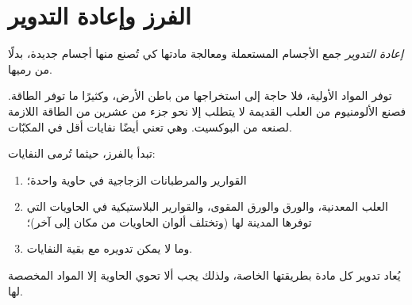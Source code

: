\section{الفرز وإعادة التدوير}

\begin{definition}\label{def:g5:raw-materials-and-recycling:recycling}
\emph{إعادة التدوير} جمع الأجسام المستعملة ومعالجة
مادتها كي تُصنع منها أجسام جديدة، بدلًا من رميها.
\end{definition}

\begin{proposition}\label{prop:g5:raw-materials-and-recycling:why}
 توفر المواد الأولية، فلا حاجة إلى استخراجها من باطن الأرض،
وكثيرًا ما توفر الطاقة. فصنع الألومنيوم من العلب القديمة لا يتطلب إلا
نحو جزء من عشرين من الطاقة اللازمة لصنعه من البوكسيت. وهي تعني أيضًا
نفايات أقل في المكبّات.
\end{proposition}

\begin{method}\label{met:g5:raw-materials-and-recycling:sort}
تبدأ  بالفرز، حيثما تُرمى النفايات:
\begin{enumerate}
  \item القوارير والمرطبانات الزجاجية في حاوية واحدة؛
  \item العلب المعدنية، والورق والورق المقوى، والقوارير البلاستيكية في
        الحاويات التي توفرها المدينة لها (وتختلف ألوان الحاويات من
        مكان إلى آخر)؛
  \item وما لا يمكن تدويره مع بقية النفايات.
\end{enumerate}
يُعاد تدوير كل مادة بطريقتها الخاصة، ولذلك يجب ألا تحوي الحاوية إلا
المواد المخصصة لها.
\end{method}

